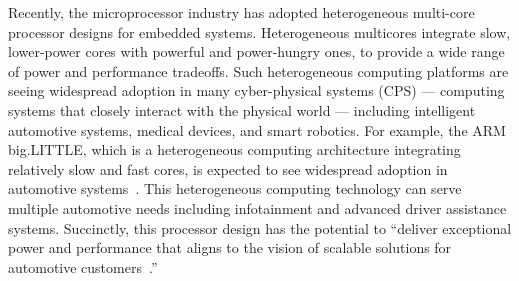 
Recently, the microprocessor industry has adopted heterogeneous multi-core processor designs for embedded systems. Heterogeneous multicores integrate slow, lower-power cores with powerful and power-hungry ones, to provide a wide range of power and performance tradeoffs. %
  Such heterogeneous computing platforms are seeing widespread adoption in many cyber-physical systems (CPS) --- computing systems that closely interact with the physical world --- including intelligent automotive systems, medical devices, and smart robotics. %
 For example, the ARM big.LITTLE, which is a heterogeneous computing architecture integrating relatively slow and fast cores, is expected to see widespread adoption in automotive systems~\cite{armvehicle, armvehicle1, armvehicle2, armvehicle3}. This heterogeneous computing technology can serve multiple automotive needs including infotainment and advanced driver assistance systems. Succinctly, this processor design has the potential to  ``deliver exceptional power and performance that aligns to the vision of scalable solutions for automotive customers~\cite{armvehicle}.''
 
